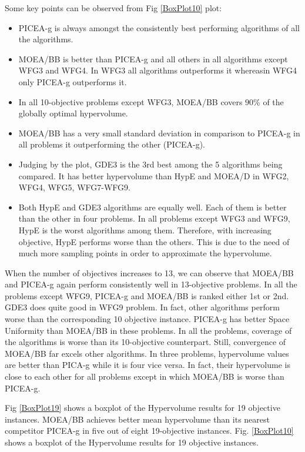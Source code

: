 \documentclass[journal]{IEEEtran}
\begin{document}
Some key points can be observed from Fig \ref{BoxPlot10} plot:
\begin{itemize}
\item PICEA-g is always amongst the consistently best performing algorithms of all the algorithms.
\item MOEA/BB is better than PICEA-g and all others in all algorithms except WFG3 and WFG4. In WFG3 all algorithms outperforms it whereasin WFG4 only PICEA-g outperforms it.
\item In all 10-objective problems except WFG3, MOEA/BB covers $90 \%$ of the globally optimal hypervolume.
\item MOEA/BB has a very small standard deviation in comparison to PICEA-g in all problems it outperforming the other (PICEA-g). 
\item Judging by the plot, GDE3 is the 3rd best among the 5 algorithms being compared. It has better hypervolume than HypE and MOEA/D in WFG2, WFG4, WFG5, WFG7-WFG9.
\item Both HypE and GDE3 algorithms are equally well. Each of them is better than the other in four problems. In all problems except WFG3 and WFG9, HypE is the worst algorithms among them. Therefore, with increasing objective, HypE performs worse than the others. This is due to the need of much more sampling points in order to approximate the hypervolume.

\end{itemize}

When the number of objectives increases to 13, we can observe that MOEA/BB and PICEA-g again perform consistently well in 13-objective problems. In all the problems except WFG9, PICEA-g and MOEA/BB is ranked either 1st or 2nd. GDE3 does quite good in WFG9 problem. In fact, other algorithms perform worse than the corresponding 10 objective instance. PICEA-g has better Space Uniformity than MOEA/BB in these problems. In all the problems, coverage of the algorithms is worse than its 10-objective counterpart. Still, convergence of MOEA/BB far excels other algorithms. In three problems, hypervolume values are better than PICA-g while it is four vice versa. In fact, their hypervolume is close to each other for all problems except in which MOEA/BB is worse than PICEA-g.


Fig \ref{BoxPlot19} shows a boxplot of the Hypervolume results for 19 objective instances. MOEA/BB achieves better mean hypervolume than its nearest competitor PICEA-g in five out of eight 19-objective instances. Fig. \ref{BoxPlot10} shows a boxplot of the Hypervolume results for 19 objective instances.
\end{document}
